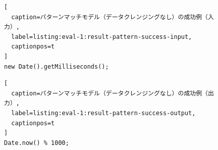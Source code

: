 \documentclass[11pt]{jreport}
\begin{document}
\begin{figure}[t]
\captionsetup{name=Listing}
\hspace{0.04\columnwidth}
\begin{minipage}[b]{0.96\linewidth}
\begin{lstlisting}[
  caption=パターンマッチモデル（データクレンジングなし）の成功例（入力）,
  label=listing:eval-1:result-pattern-success-input,
  captionpos=t
]
new Date().getMilliseconds();
\end{lstlisting}
\end{minipage}

\hspace{0.04\columnwidth}
\begin{minipage}[b]{0.96\linewidth}
\begin{lstlisting}[
  caption=パターンマッチモデル（データクレンジングなし）の成功例（出力）,
  label=listing:eval-1:result-pattern-success-output,
  captionpos=t
]
Date.now() % 1000;
\end{lstlisting}
\end{minipage}
\end{figure}
\end{document}
